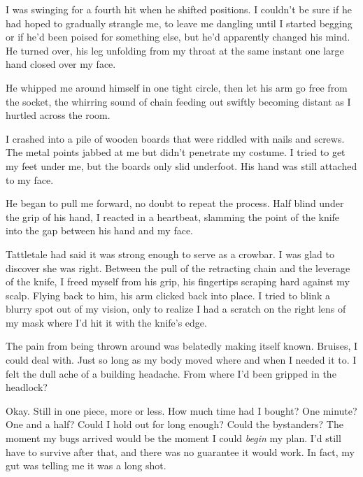 I was swinging for a fourth hit when he shifted positions.  I couldn't be sure if he had hoped to gradually strangle me, to leave me dangling until I started begging or if he'd been poised for something else, but he'd apparently changed his mind.  He turned over, his leg unfolding from my throat at the same instant one large hand closed over my face.



He whipped me around himself in one tight circle, then let his arm go free from the socket, the whirring sound of chain feeding out swiftly becoming distant as I hurtled across the room.



I crashed into a pile of wooden boards that were riddled with nails and screws.  The metal points jabbed at me but didn't penetrate my costume.  I tried to get my feet under me, but the boards only slid underfoot.  His hand was still attached to my face.



He began to pull me forward, no doubt to repeat the process.  Half blind under the grip of his hand, I reacted in a heartbeat, slamming the point of the knife into the gap between his hand and my face.



Tattletale had said it was strong enough to serve as a crowbar.  I was glad to discover she was right.  Between the pull of the retracting chain and the leverage of the knife, I freed myself from his grip, his fingertips scraping hard against my scalp.  Flying back to him, his arm clicked back into place.  I tried to blink a blurry spot out of my vision, only to realize I had a scratch on the right lens of my mask where I'd hit it with the knife's edge.



The pain from being thrown around was belatedly making itself known.  Bruises, I could deal with.  Just so long as my body moved where and when I needed it to.  I felt the dull ache of a building headache.  From where I'd been gripped in the headlock?



Okay.  Still in one piece, more or less.  How much time had I bought?  One minute?  One and a half?  Could I hold out for long enough?  Could the bystanders?  The moment my bugs arrived would be the moment I could \emph{begin} my plan.  I'd still have to survive after that, and there was no guarantee it would work.  In fact, my gut was telling me it was a long shot.



